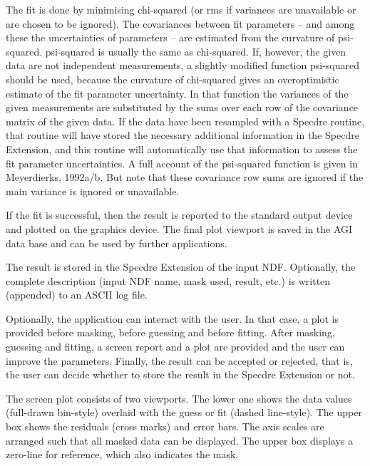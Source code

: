 {{      The fit is done by minimising chi-squared (or rms if variances are
      unavailable or are chosen to be ignored). The covariances between
      fit parameters -- and among these the uncertainties of parameters --
      are estimated from the curvature of psi-squared. psi-squared is
      usually the same as chi-squared. If, however, the given data are
      not independent measurements, a slightly modified function
      psi-squared should be used, because the curvature of chi-squared
      gives an overoptimistic estimate of the fit parameter uncertainty.
      In that function the variances of the given measurements are
      substituted by the sums over each row of the covariance matrix of
      the given data. If the data have been resampled with a Specdre
      routine, that routine will have stored the necessary additional
      information in the Specdre Extension, and this routine will
      automatically use that information to assess the fit parameter
      uncertainties. A full account of the psi-squared function is given
      in Meyerdierks, 1992a/b. But note that these covariance row sums
      are ignored if the main variance is ignored or unavailable.

      If the fit is successful, then the result is reported to
      the standard output device and plotted on the graphics device. The
      final plot viewport is saved in the AGI data base and can be used
      by further applications.

      The result is stored in the Specdre Extension of the input NDF.
      Optionally, the complete description (input NDF name, mask used,
      result, etc.) is written (appended) to an ASCII log file.

      Optionally, the application can interact with the user. In that
      case, a plot is provided before masking, before guessing and
      before fitting. After masking, guessing and fitting, a screen
      report and a plot are provided and the user can improve the
      parameters. Finally, the result can be accepted or rejected, that
      is, the user can decide whether to store the result in the Specdre
      Extension or not.

      The screen plot consists of two viewports. The lower one shows the
      data values (full-drawn bin-style) overlaid with the guess or fit
      (dashed line-style). The upper box shows the residuals (cross
      marks) and error bars. The axis scales are arranged such that
      all masked data can be displayed. The upper box displays a
      zero-line for reference, which also indicates the mask.

}}
